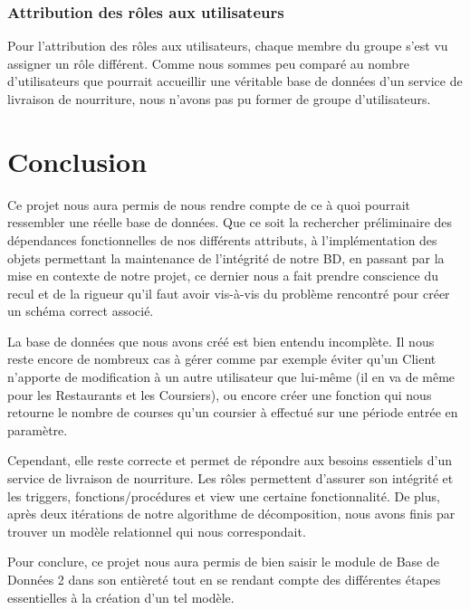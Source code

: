 \documentclass[french]{article}
\begin{document}
            \subsubsection*{Attribution des rôles aux utilisateurs}
                Pour l'attribution des rôles aux utilisateurs, chaque membre du groupe s'est vu assigner un rôle différent. Comme nous sommes peu comparé au nombre d'utilisateurs que pourrait accueillir une véritable base de données d'un service de livraison de nourriture, nous n'avons pas pu former de groupe d'utilisateurs.

    \section{Conclusion}
        Ce projet nous aura permis de nous rendre compte de ce à quoi pourrait ressembler une réelle base de données. Que ce soit la rechercher préliminaire des dépendances fonctionnelles de nos différents attributs, à l'implémentation des objets permettant la maintenance de l'intégrité de notre BD, en passant par la mise en contexte de notre projet, ce dernier nous a fait prendre conscience du recul et de la rigueur qu'il faut avoir vis-à-vis du problème rencontré pour créer un schéma correct associé.\smallskip
        
        \noindent La base de données que nous avons créé est bien entendu incomplète. Il nous reste encore de nombreux cas à gérer comme par exemple éviter qu'un Client n'apporte de modification à un autre utilisateur que lui-même (il en va de même pour les Restaurants et les Coursiers), ou encore créer une fonction qui nous retourne le nombre de courses qu'un coursier à effectué sur une période entrée en paramètre.\smallskip
  
        \noindent Cependant, elle reste correcte et permet de répondre aux besoins essentiels d'un service de livraison de nourriture. Les rôles permettent d'assurer son intégrité et les triggers, fonctions/procédures et view une certaine fonctionnalité. De plus, après deux itérations de notre algorithme de décomposition, nous avons finis par trouver un modèle relationnel qui nous correspondait.\smallskip

        \noindent Pour conclure, ce projet nous aura permis de bien saisir le module de Base de Données 2 dans son entièreté tout en se rendant compte des différentes étapes essentielles à la création d'un tel modèle.
\end{document}
